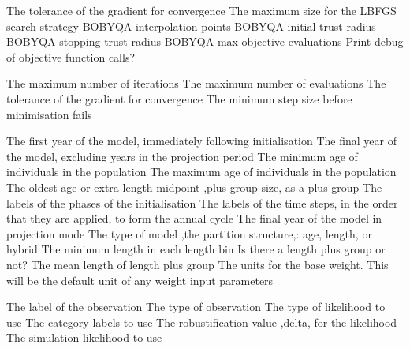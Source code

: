  {The tolerance of the gradient for convergence}
 {The maximum size for the LBFGS search strategy}
 {BOBYQA interpolation points}
 {BOBYQA initial trust radius}
 {BOBYQA stopping trust radius}
 {BOBYQA max objective evaluations}
 {Print debug of objective function calls?}
\par\textbf{}\par
{} {The maximum number of iterations}
 {The maximum number of evaluations}
 {The tolerance of the gradient for convergence}
 {The minimum step size before minimisation fails}
\par\par
{} {The first year of the model, immediately following initialisation}
 {The final year of the model, excluding years in the projection period}
 {The minimum age of individuals in the population}
 {The maximum age of individuals in the population}
 {The oldest age or extra length midpoint ,plus group size, as a plus group}
 {The labels of the phases of the initialisation}
 {The labels of the time steps, in the order that they are applied, to form the annual cycle}
 {The final year of the model in projection mode}
 {The type of model ,the partition structure,: age, length, or hybrid}
 {The minimum length in each length bin}
 {Is there a length plus group or not?}
 {The mean length of length plus group}
 {The units for the base weight. This will be the default unit of any weight input parameters}
\par\par
{} {The label of the observation}
 {The type of observation}
 {The type of likelihood to use}
 {The category labels to use}
 {The robustification value ,delta, for the likelihood}
 {The simulation likelihood to use}
